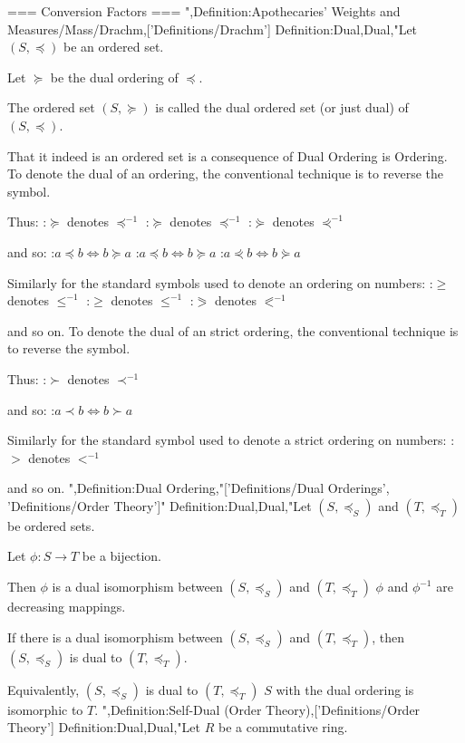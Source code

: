 === Conversion Factors ===
",Definition:Apothecaries' Weights and Measures/Mass/Drachm,['Definitions/Drachm']
Definition:Dual,Dual,"Let $\left( S, \preceq \right)$ be an ordered set.

Let $\succeq$ be the dual ordering of $\preceq$.


The ordered set $\left( S, \succeq \right)$ is called the dual ordered set (or just dual) of $\left( S, \preceq \right)$.


That it indeed is an ordered set is a consequence of Dual Ordering is Ordering.
To denote the dual of an ordering, the conventional technique is to reverse the symbol.

Thus:
:$\succeq$ denotes $\preceq^{-1}$
:$\succcurlyeq$ denotes $\preccurlyeq^{-1}$
:$\curlyeqsucc$ denotes $\curlyeqprec^{-1}$

and so:
:$a \preceq b \iff b \succeq a$
:$a \preccurlyeq b \iff b \succcurlyeq a$
:$a \curlyeqprec b \iff b \curlyeqsucc a$


Similarly for the standard symbols used to denote an ordering on numbers:
:$\ge$ denotes $\le^{-1}$
:$\geqslant$ denotes $\leqslant^{-1}$
:$\eqslantgtr$ denotes $\eqslantless^{-1}$

and so on.
To denote the dual of an strict ordering, the conventional technique is to reverse the symbol.

Thus:
:$\succ$ denotes $\prec^{-1}$

and so:
:$a \prec b \iff b \succ a$


Similarly for the standard symbol used to denote a strict ordering on numbers:
:$>$ denotes $<^{-1}$

and so on.
",Definition:Dual Ordering,"['Definitions/Dual Orderings', 'Definitions/Order Theory']"
Definition:Dual,Dual,"Let $\left( S, \preceq_S \right)$ and $\left( T, \preceq_T \right)$ be ordered sets.

Let $\phi: S \to T$ be a bijection.


Then $\phi$ is a dual isomorphism between $\left( S, \preceq_S \right)$ and $\left( T, \preceq_T \right)$  $\phi$ and $\phi^{-1}$ are decreasing mappings.


If there is a dual isomorphism between $\left( S, \preceq_S \right)$ and $\left( T, \preceq_T \right)$, then $\left( S, \preceq_S \right)$ is dual to $\left( T, \preceq_T \right)$.

Equivalently, $\left( S, \preceq_S \right)$ is dual to $\left( T, \preceq_T \right)$  $S$ with the dual ordering is isomorphic to $T$.
",Definition:Self-Dual (Order Theory),['Definitions/Order Theory']
Definition:Dual,Dual,"Let $R$ be a commutative ring.

